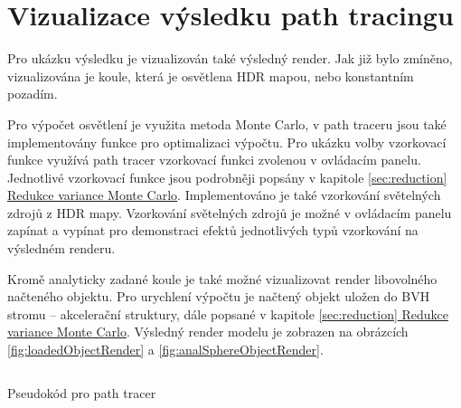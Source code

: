 \documentclass[czech,master]{diploma}
\begin{document}
\section{Vizualizace výsledku path tracingu}
Pro ukázku výsledku je vizualizován také výsledný render. Jak již bylo zmíněno, vizualizována je koule, která je osvětlena HDR mapou, nebo konstantním pozadím.\par
Pro výpočet osvětlení je využita metoda Monte Carlo, v path traceru jsou také implementovány funkce pro optimalizaci výpočtu. Pro ukázku volby vzorkovací funkce využívá path tracer vzorkovací funkci zvolenou v ovládacím panelu. Jednotlivé vzorkovací funkce jsou podrobněji popsány v kapitole \hyperref[sec:reduction]{\ref{sec:reduction} Redukce variance Monte Carlo}. Implementováno je také vzorkování světelných zdrojů z HDR mapy. Vzorkování světelných zdrojů je možné v ovládacím panelu zapínat a vypínat pro demonstraci efektů jednotlivých typů vzorkování na výsledném renderu.\par
Kromě analyticky zadané koule je také možné vizualizovat render libovolného načteného objektu. Pro urychlení výpočtu je načtený objekt uložen do BVH stromu -- akcelerační struktury, dále popsané v kapitole \hyperref[sec:reduction]{\ref{sec:reduction} Redukce variance Monte Carlo}. Výsledný render modelu je zobrazen na obrázcích \hyperref[fig:loadedObjectRender]{\ref{fig:loadedObjectRender}} a \hyperref[fig:analSphereObjectRender]{\ref{fig:analSphereObjectRender}}.

\begin{listing}[ht]
  \inputminted{python}{pathTracer.py}
  \caption{Pseudokód pro path tracer}
  \label{src:pathtracer}
\end{listing}
\end{document}
